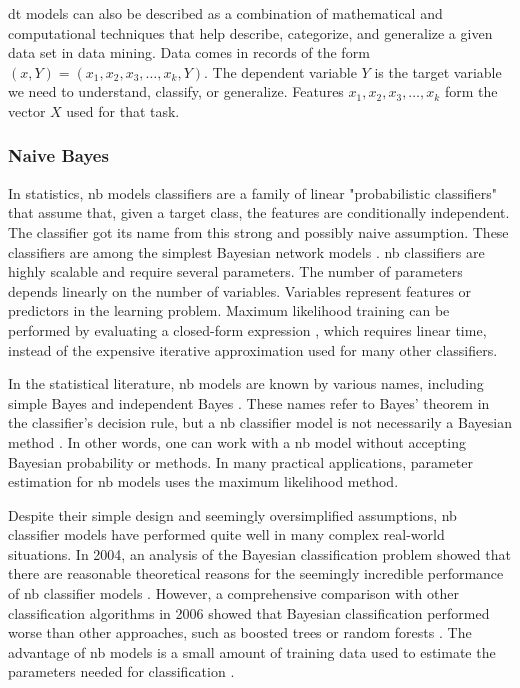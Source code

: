 \documentclass[sn-mathphys-num]{sn-jnl}%
\begin{document}
\acrshort{dt} models can also be described as a combination of mathematical and computational techniques that help describe, categorize, and generalize a given data set in data mining. Data comes in records of the form $(x, Y) = (x_{1}, x_{2}, x_{3}, \ldots, x_{k}, Y)$. The dependent variable $Y$ is the target variable we need to understand, classify, or generalize. Features $x_{1}, x_{2}, x_{3}, \ldots, x_{k}$ form the vector $X$ used for that task.

\subsubsection{Naive Bayes}

In statistics, \acrfull{nb} models classifiers are a family of linear "probabilistic classifiers" that assume that, given a target class, the features are conditionally independent. The classifier got its name from this strong and possibly naive assumption. These classifiers are among the simplest Bayesian network models \cite{McCallum2011}. \acrshort{nb} classifiers are highly scalable and require several parameters. The number of parameters depends linearly on the number of variables. Variables represent features or predictors in the learning problem. Maximum likelihood training can be performed by evaluating a closed-form expression \cite{Russell1999}, which requires linear time, instead of the expensive iterative approximation used for many other classifiers.

In the statistical literature, \acrshort{nb} models are known by various names, including simple Bayes and independent Bayes \cite{Hand2001}. These names refer to Bayes' theorem in the classifier's decision rule, but a \acrshort{nb} classifier model is not necessarily a Bayesian method \cite{Russell1999, Hand2001}. In other words, one can work with a \acrshort{nb} model without accepting Bayesian probability or methods. In many practical applications, parameter estimation for \acrshort{nb} models uses the maximum likelihood method.

Despite their simple design and seemingly oversimplified assumptions, \acrshort{nb} classifier models have performed quite well in many complex real-world situations. In 2004, an analysis of the Bayesian classification problem showed that there are reasonable theoretical reasons for the seemingly incredible performance of \acrshort{nb} classifier models \cite{Zhang2004}. However, a comprehensive comparison with other classification algorithms in 2006 showed that Bayesian classification performed worse than other approaches, such as boosted trees or random forests \cite{Caruana2006}. The advantage of \acrshort{nb} models is a small amount of training data used to estimate the parameters needed for classification \cite{stackexchange}.
\end{document}
